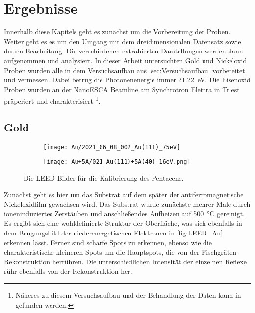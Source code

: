 \chapter{Ergebnisse}
    Innerhalb diese Kapitels geht es zunächst um die Vorbereitung der Proben.
    Weiter geht es es um den Umgang mit dem dreidimensionalen Datensatz sowie dessen Bearbeitung.
    Die verschiedenen extrahierten Darstellungen werden dann aufgenommen und analysiert.
    In dieser Arbeit untersuchten Gold und Nickeloxid Proben wurden alle in dem Versuchsaufbau aus \autoref{sec:Versuchsaufbau} vorbereitet und vermessen.
    Dabei betrug die Photonenenergie immer \SI{21.22}{\electronvolt}.
    Die Eisenoxid Proben wurden an der NanoESCA Beamline am Synchrotron Elettra in Triest präperiert und charakterisiert \footnote{Näheres zu diesem Versuchsaufbau und der Behandlung der Daten kann in \cite{ma-DJ} gefunden werden.}.

    \section{Gold}
        \begin{figure}
            \centering
            \begin{subfigure}{0.48\textwidth}
                \centering
                \texttt{[image: Au/2021\_06\_08\_002\_Au(111)\_75eV]}
                \label{fig:LEED_Au}
            \end{subfigure}
            \begin{subfigure}{0.48\textwidth}
                \centering
                \texttt{[image: Au+5A/021\_Au(111)+5A(40)\_16eV.png]}
                \label{fig:LEED_Au+5A}
            \end{subfigure}
            \caption{Die LEED-Bilder für die Kalibrierung des Pentacene.}
        \label{fig:Substrate}
        \end{figure}
        Zunächst geht es hier um das Substrat auf dem später der antiferromagnetische Nickeloxidfilm gewachsen wird.
        Das Substrat wurde zunächste mehrer Male durch ioneninduziertes Zerstäuben und anschließendes Aufheizen auf \SI{500}{\celsius} gereinigt.
        Es ergibt sich eine wohldefinierte Struktur der Oberfläche, was sich ebenfalls in dem Beugungsbild der niederenergetischen Elektronen in \autoref{fig:LEED_Au} erkennen lässt.
        Ferner sind scharfe Spots zu erkennen, ebenso wie die charakteristische kleineren Spots um die Hauptspots, die von der Fischgräten-Rekonstruktion herrühren.
        Die unterschiedlichen Intensität der einzelnen Reflexe rühr ebenfalls von der Rekonstruktion her.

